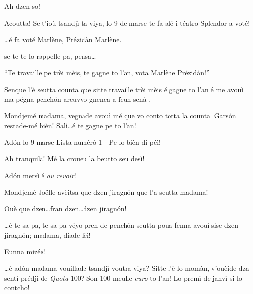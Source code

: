 \begin{drama}
\Jeanspeaks Ah dzen so!

\Dallasspeaks Acoutta! Se t'ioù tsandjì ta viya, lo 9 de marse te fa alé i téatro Splendor a voté!
 
\Joellespeaks \ldots é fa voté Marlène, Prézidàn Marlène.

\Dallasspeaks {} se te te lo rappelle pa, pensa\ldots
 
\Joelledallasspeaks {} ``Te travaille pe trèi mèis, te gagne to l'an, vota Marlène Prézidàn!''



\Saventaspeaks Senque l'è seutta counta que sitte travaille trèi mèis é gagne to l’an é me avouì ma pégna pench\'on areuvvo gnenca a feun senà .

\Dallasspeaks Mondjemé madama, vegnade avouì mé que vo conto totta la counta!  Gars\'on restade-mé bièn! Salì\ldots é te gagne pe to l'an!



\Joellespeaks Ad\'on lo 9 marse Lista num\'er\'o 1 - Pe lo bièn di péì!

\Jeanspeaks Ah tranquila! Mé la croueu la beutto seu desì! 

\Joellespeaks Ad\'on mersì é \textit{au revoir}!



\Dallasspeaks {} Mondjemé Jo\"{e}lle avèitsa que dzen jiragn\'on que l'a seutta madama!

\Joellespeaks {} Ouè que dzen\ldots fran dzen\ldots dzen jiragn\'on!

\Dallasspeaks \ldots é te sa pa, te sa pa véyo pren de pench\'on seutta poua fenna avouì sise dzen jiragn\'on; madama, diade-lèi!

\Saventaspeaks Eunna mizée!

\Dallasspeaks \ldots é ad\'on madama vouillade tsandjì voutra viya? Sitte l'è lo momàn, v'ouèide dza sentì prédjì de \textit{Quota} 100? Son 100 meulle \textit{euro} to l'an! Lo premì de janvì si lo contcho!


\end{drama}
